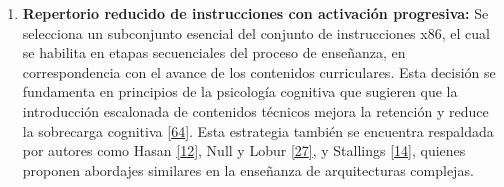 \documentclass[12pt,oneside]{templates/unerthesis}
\begin{document}
\begin{enumerate}
\def\labelenumi{\arabic{enumi}.}
\setcounter{enumi}{2}
\item
  \textbf{Repertorio reducido de instrucciones con activación progresiva:}
  Se selecciona un subconjunto esencial del conjunto de instrucciones x86, el cual se habilita en etapas secuenciales del proceso de enseñanza, en correspondencia con el avance de los contenidos curriculares. Esta decisión se fundamenta en principios de la psicología cognitiva que sugieren que la introducción escalonada de contenidos técnicos mejora la retención y reduce la sobrecarga cognitiva \protect\hyperlink{ref-nationalacademies2018how}{{[}64{]}}. Esta estrategia también se encuentra respaldada por autores como Hasan \protect\hyperlink{ref-hasan_survey_2012}{{[}12{]}}, Null y Lobur \protect\hyperlink{ref-null_essentials_2023}{{[}27{]}}, y Stallings \protect\hyperlink{ref-stallings_computer_2021}{{[}14{]}}, quienes proponen abordajes similares en la enseñanza de arquitecturas complejas.

  \begin{table}[!h]
   \centering
   \caption{\label{tab:activacionprogresiva}Activación progresiva del repertorio de instrucciones}
   \centering
   \end{table}


\end{enumerate}
\end{document}
